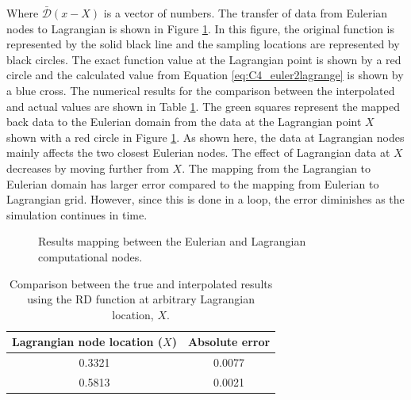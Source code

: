 Where $\bar{\mathcal{D}}(x - X)$ is a vector of numbers. The transfer of data from Eulerian nodes to Lagrangian is shown in Figure \ref{fig:C4_euler2lagrangeExample}. In this figure, the original function is represented by the solid black line and the sampling locations are represented by black circles. The exact function value at the Lagrangian point is shown by a red circle and the calculated value from Equation \eqref{eq:C4_euler2lagrange} is shown by a blue cross. The numerical results for the comparison between the interpolated and actual values are shown in Table \ref{table:C4_euler2lagrangeExample}. The green squares represent the mapped back data to the Eulerian domain from the data at the Lagrangian point $X$ shown with a red circle in Figure \ref{fig:C4_euler2lagrangeExample}. As shown here, the data at Lagrangian nodes mainly affects the two closest Eulerian nodes. The effect of Lagrangian data at $X$ decreases by moving further from $X$. The mapping from the Lagrangian to Eulerian domain has larger error compared to the mapping from Eulerian to Lagrangian grid. However, since this is done in a loop, the error diminishes as the simulation continues in time.

\begin{figure}[H]
    \centering
    \quad
    \caption{Results mapping between the Eulerian and Lagrangian computational nodes.}
    \label{fig:C4_euler2lagrangeExample}
\end{figure}

\begin{table}[H]
\centering
\begin{tabular}{| c | c |}
    \hline
    Lagrangian node location ($X$) & Absolute error \\ \hline \hline
    0.3321 & 0.0077 \\ \hline
    0.5813 & 0.0021 \\ \hline
\end{tabular}
\caption{Comparison between the true and interpolated results using the RD function at arbitrary Lagrangian location, $X$.}
\label{table:C4_euler2lagrangeExample}
\end{table}

